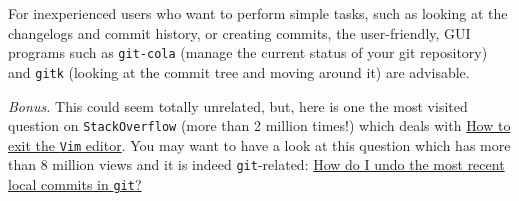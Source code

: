 \documentclass[a4paper,12pt,%
              final%
              ]{article}
\begin{document}
For inexperienced users who want to perform simple tasks, such as looking at the changelogs and commit history, or creating commits, the user-friendly, GUI programs such as \texttt{git-cola} (manage the current status of your git repository) and \texttt{gitk} (looking at the commit tree and moving around it) are advisable.

\emph{Bonus.} This could seem totally unrelated, but, here is one the most visited question on \texttt{StackOverflow} (more than 2 million times!) which deals with \href{https://stackoverflow.com/questions/11828270/how-do-i-exit-the-vim-editor}{How to exit the \texttt{Vim} editor}. You may want to have a look at this question which has more than 8 million views and it is indeed \texttt{git}-related: \href{https://stackoverflow.com/questions/927358/how-do-i-undo-the-most-recent-local-commits-in-git}{How do I undo the most recent local commits in \texttt{git}?}
\end{document}
